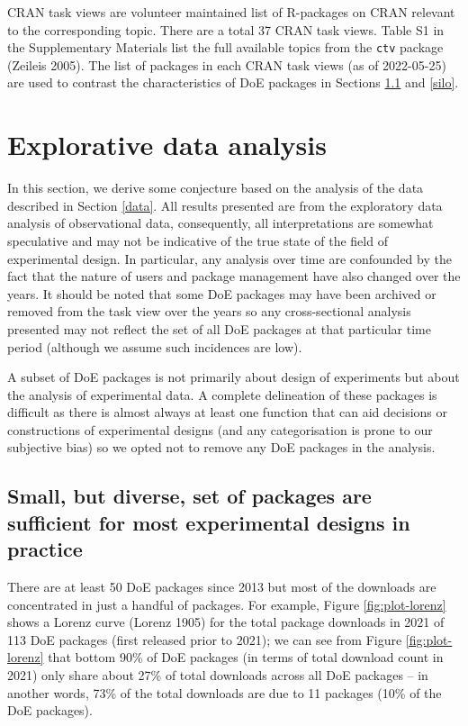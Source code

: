 \documentclass{article}
\begin{document}
CRAN task views are volunteer maintained list of R-packages on CRAN
relevant to the corresponding topic. There are a total 37 CRAN task
views. Table S1 in the Supplementary Materials list the full available
topics from the \texttt{ctv} package (Zeileis 2005). The list of
packages in each CRAN task views (as of 2022-05-25) are used to contrast
the characteristics of DoE packages in Sections \ref{popular} and
\ref{silo}.

\hypertarget{eda}{%
\section{Explorative data analysis}\label{eda}}

In this section, we derive some conjecture based on the analysis of the
data described in Section \ref{data}. All results presented are from the
exploratory data analysis of observational data, consequently, all
interpretations are somewhat speculative and may not be indicative of
the true state of the field of experimental design. In particular, any
analysis over time are confounded by the fact that the nature of users
and package management have also changed over the years. It should be
noted that some DoE packages may have been archived or removed from the
task view over the years so any cross-sectional analysis presented may
not reflect the set of all DoE packages at that particular time period
(although we assume such incidences are low).

A subset of DoE packages is not primarily about design of experiments
but about the analysis of experimental data. A complete delineation of
these packages is difficult as there is almost always at least one
function that can aid decisions or constructions of experimental designs
(and any categorisation is prone to our subjective bias) so we opted not
to remove any DoE packages in the analysis.

\hypertarget{popular}{%
\subsection{Small, but diverse, set of packages are sufficient for most
experimental designs in practice}\label{popular}}

There are at least 50 DoE packages since 2013 but most of the downloads
are concentrated in just a handful of packages. For example, Figure
\ref{fig:plot-lorenz} shows a Lorenz curve (Lorenz 1905) for the total
package downloads in 2021 of 113 DoE packages (first released prior to
2021); we can see from Figure \ref{fig:plot-lorenz} that bottom 90\% of
DoE packages (in terms of total download count in 2021) only share about
27\% of total downloads across all DoE packages -- in another words,
73\% of the total downloads are due to 11 packages (10\% of the DoE
packages).
\end{document}
